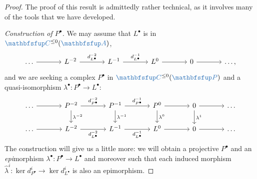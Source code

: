\begin{proof}
  The proof of this result is admittedly rather technical, as it
  involves many of the tools that we have developed.

  \emph{Construction of $P^\bullet$.} We may assume that $L^\bullet$
  is in $\categ{C}^{\le 0}(\categ{A})$,
  \[\begin{tikzcd}[column sep=large]
      \dots \arrow[r] & L^{-2} \arrow[r, "d_{L^\bullet}^{-2}"] &
      L^{-1} \arrow[r, "d_{L^\bullet}^{-1}"] & L^0 \arrow[r] & 0
      \arrow[r] & \dots,
    \end{tikzcd}\] and we are seeking a complex $P^\bullet$ in
  $\categ{C}^{\le 0}(\categ{P})$ and a quasi-isomorphism
  $\lambda^\bullet : P^\bullet \to L^\bullet$:
  \[\begin{tikzcd}[column sep=large]
      \dots \arrow[r] & P^{-2} \arrow[r, "d_{P^\bullet}^{-2}"]
      \arrow[d, "\lambda^{-2}"] & P^{-1} \arrow[r,
      "d_{P^\bullet}^{-1}"] \arrow[d, "\lambda^{-1}"] & P^0 \arrow[r]
      \arrow[d, "\lambda^0"] &
      0 \arrow[r] \arrow[d, "\lambda^1"] & \dots \\
      \dots \arrow[r] & L^{-2} \arrow[r, "d_{L^\bullet}^{-2}"'] &
      L^{-1} \arrow[r, "d_{L^\bullet}^{-1}"'] & L^0 \arrow[r] & 0
      \arrow[r] & \dots
    \end{tikzcd}\] The construction will give us a little more: we
  will obtain a projective $P^\bullet$ and an \emph{epi}morphism
  $\lambda^\bullet : P^\bullet \to L^\bullet$ and moreover such that
  each induced morphism
  $\hat\lambda^i : \ker d^i_{P^\bullet} \to \ker d^i_{L^\bullet}$ is
  also an epimorphism.


\end{proof}
